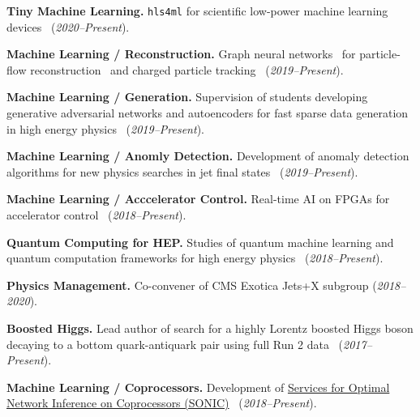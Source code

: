 \documentclass[11pt]{res}
\begin{document}
\begin{resume}
\textbf{Tiny Machine Learning.} \texttt{hls4ml} for scientific low-power machine learning devices~\cite{DiGuglielmo:2021ide,Hawks:2021ruw,Banbury:2021mlperf,Fahim:2021cic} (\textit{2020--Present}).

\textbf{Machine Learning / Reconstruction.} Graph neural networks~\cite{Duarte:2020ngm} for particle-flow reconstruction~\cite{Pata:2021oez} and charged particle tracking~\cite{Dezoort:2021kfk,Heintz:2020soy} (\textit{2019--Present}).

\textbf{Machine Learning / Generation.} Supervision of students developing generative adversarial networks and autoencoders for fast sparse data generation in high energy physics~\cite{Kansal:2021cqp,Kansal:2020svm} (\textit{2019--Present}).

\textbf{Machine Learning / Anomly Detection.} Development of anomaly detection algorithms for new physics searches in jet final states~\cite{Aarrestad:2021oeb,Kasieczka:2021xcg,Wozniak:2020} (\textit{2019--Present}).

\textbf{Machine Learning / Acccelerator Control.} Real-time AI on FPGAs for accelerator control~\cite{John:2020sak} (\textit{2018--Present}).

\textbf{Quantum Computing for HEP.} Studies of quantum machine learning and quantum computation frameworks for high energy physics~\cite{Zlokapa:2019tkn} (\textit{2018--Present}).

\textbf{Physics Management.} Co-convener of CMS Exotica Jets+X subgroup (\textit{2018--2020}).

\textbf{Boosted Higgs.} Lead author of search for a highly Lorentz boosted Higgs boson
  decaying to a bottom quark-antiquark pair using full Run 2 data~\cite{Sirunyan:2020hwz} (\textit{2017--Present}).

\textbf{Machine Learning / Coprocessors.} Development of \href{https://github.com/fastmachinelearning/SonicCMS}{Services for Optimal Network Inference on Coprocessors (SONIC)}~\cite{Krupa:2020bwg,Rankin:2020usv,neurips2019_sonic,Duarte:2019fta} (\textit{2018--Present}).


\end{resume}
\end{document}
